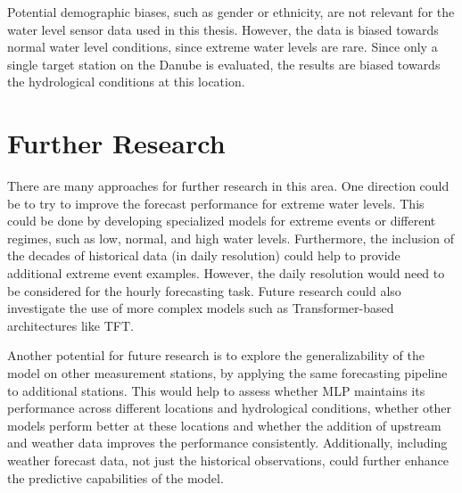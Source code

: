 Potential demographic biases, such as gender or ethnicity, are not relevant for the water level sensor data used in this thesis. However, the data is biased towards normal water level conditions, since extreme water levels are rare. Since only a single target station on the Danube is evaluated, the results are biased towards the hydrological conditions at this location.

\section{Further Research}
There are many approaches for further research in this area. One direction could be to try to improve the forecast performance for extreme water levels. This could be done by developing specialized models for extreme events or different regimes, such as low, normal, and high water levels. Furthermore, the inclusion of the decades of historical data (in daily resolution) could help to provide additional extreme event examples. However, the daily resolution would need to be considered for the hourly forecasting task. Future research could also investigate the use of more complex models such as Transformer-based architectures like \ac{TFT}.

Another potential for future research is to explore the generalizability of the model on other measurement stations, by applying the same forecasting pipeline to additional stations. This would help to assess whether \ac{MLP} maintains its performance across different locations and hydrological conditions, whether other models perform better at these locations and whether the addition of upstream and weather data improves the performance consistently. Additionally, including weather forecast data, not just the historical observations, could further enhance the predictive capabilities of the model.
